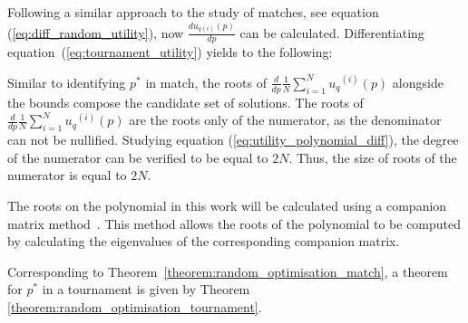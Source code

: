 \documentclass[10pt]{article}
\begin{document}
Following a similar approach to the study of matches, see equation
(\ref{eq:diff_random_utility}), now \(\frac{du_{q(i)}(p)}{dp}\) can be 
calculated. Differentiating equation~(\ref{eq:tournament_utility}) yields to 
the following:


Similar to identifying \(p^*\) in match, the roots 
of \(\frac{d}{dp} \frac{1}{N} \sum_{i=1} ^ {N} {u_q}^{(i)} (p)\) alongside the 
bounds compose the candidate set 
of solutions. The roots of 
\(\frac{d}{dp} \frac{1}{N} \sum_{i=1} ^ {N} {u_q}^{(i)} (p)\) are the roots 
only of the numerator, as the denominator can not be nullified. Studying 
equation (\ref{eq:utility_polynomial_diff}), the degree of the numerator can 
be verified to be equal to \(2N\). Thus, the size of roots of the numerator
is equal to \(2N\).

The roots on the polynomial in this work will be calculated using a companion 
matrix method~\cite{Niu2003}. This method allows the roots of the polynomial to
be computed by calculating the eigenvalues of the corresponding companion 
matrix.

Corresponding to Theorem~\ref{theorem:random_optimisation_match}, a theorem 
for \(p^*\) in a tournament is given by Theorem
\ref{theorem:random_optimisation_tournament}.
\end{document}
